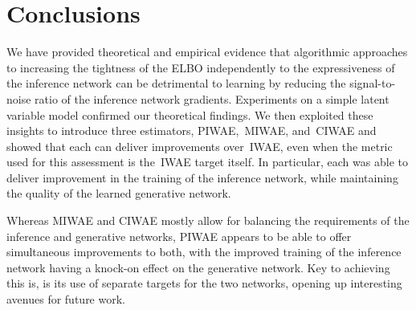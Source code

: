 
\section{Conclusions}
We have provided theoretical and empirical evidence that algorithmic approaches to increasing the tightness of the \gls{ELBO} independently to the expressiveness of the inference network can be detrimental to learning by reducing the
signal-to-noise ratio of the inference network gradients.
Experiments on a simple latent variable model confirmed our theoretical findings.
We then exploited these insights to introduce three estimators,
\gls{PIWAE},~\gls{MIWAE}, and~\gls{CIWAE} and showed that each
can deliver improvements over~\gls{IWAE}, even when the metric
used for this assessment is the~\gls{IWAE} target itself.  In particular, 
each was able to deliver improvement in the training of the inference network,
while maintaining the quality of the learned generative network.

Whereas \gls{MIWAE} and \gls{CIWAE} mostly allow for balancing the requirements of
the inference and generative networks, \gls{PIWAE} appears to be able to offer
simultaneous improvements to both, with the improved training of the inference network
having a knock-on effect on the generative network.  Key to achieving this is, is its use
of separate targets for the two networks, opening up interesting avenues for
future work.

